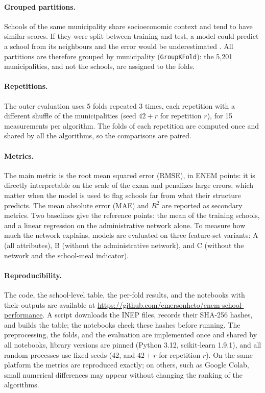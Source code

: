 \paragraph{Grouped partitions.} Schools of the same municipality share socioeconomic context and
tend to have similar scores. If they were split between training and test, a model could predict a
school from its neighbours and the error would be underestimated \cite{roberts2017crossvalidation}.
All partitions are therefore grouped by municipality (\texttt{GroupKFold}): the 5{,}201
municipalities, and not the schools, are assigned to the folds.

\paragraph{Repetitions.} The outer evaluation uses 5 folds repeated 3 times, each repetition with a
different shuffle of the municipalities (seed $42 + r$ for repetition $r$), for 15 measurements per
algorithm. The folds of each repetition are computed once and shared by all the algorithms, so the
comparisons are paired.

\paragraph{Metrics.} The main metric is the root mean squared error (RMSE), in ENEM points: it is
directly interpretable on the scale of the exam and penalizes large errors, which matter when the
model is used to flag schools far from what their structure predicts. The mean absolute error (MAE)
and $R^2$ are reported as secondary metrics. Two baselines give the reference points: the mean of
the training schools, and a linear regression on the administrative network alone. To measure
how much the network explains, models are evaluated on three feature-set variants: A (all
attributes), B (without the administrative network), and C (without the network and the
school-meal indicator).

\paragraph{Reproducibility.} The code, the school-level table, the per-fold results, and the
notebooks with their outputs are available at
\url{https://github.com/emersonheto/enem-school-performance}. A script downloads the INEP files,
records their SHA-256 hashes, and builds the table; the notebooks check these hashes before
running. The preprocessing, the folds, and the evaluation are implemented once and shared by all
notebooks, library versions are pinned (Python 3.12, scikit-learn 1.9.1), and all random
processes use fixed seeds (42, and $42 + r$ for repetition $r$). On the same platform the metrics
are reproduced exactly; on others, such as Google Colab, small numerical differences may appear
without changing the ranking of the algorithms.

